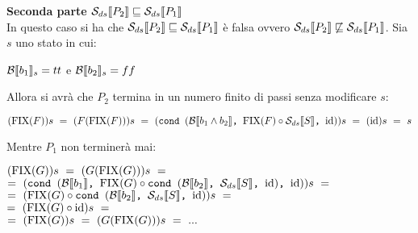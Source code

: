 {    \textbf{Seconda parte $\dsCtxt{P_2} \mineq \dsCtxt{P_1}$}\\
    In questo caso si ha che $\dsCtxt{P_2} \mineq \dsCtxt{P_1}$ è falsa ovvero
    $\dsCtxt{P_2} \notmineq \dsCtxt{P_1}$. Sia $s$ uno stato in cui:
    \begin{center}
    $\evalBbs{b_1}{s}=tt $ e $ \evalBbs{b_2}{s}=ff$
    \end{center}
    Allora si avrà che $P_2$ termina in un numero finito di passi senza
    modificare $s$:
    \begin{center}
    $(\fixp{F})s~=~(F(\fixp{F}))s~=~
    (\cond{b_1\and{}b_2}{\fixp{F} \circ \Sds}{\idDS})s~=~(\idDS)s~=~s$
    \end{center}
    Mentre $P_1$ non terminerà mai:
    \begin{center}
    $(\fixp{G})s~=~(G(\fixp{G}))s~=$\\$=~
    (\cond{b_1}{\fixp{G} \circ \cond{b_2}{\Sds}{\idDS}}{\idDS})s~=$\\$=~
    (\fixp{G} \circ \cond{b_2}{\Sds}{\idDS})s~=$\\$=~
    (\fixp{G} \circ \idDS)s~=$\\$=~
    (\fixp{G})s~=~(G(\fixp{G}))s~=~...$
    \end{center}
    
}
\newpage